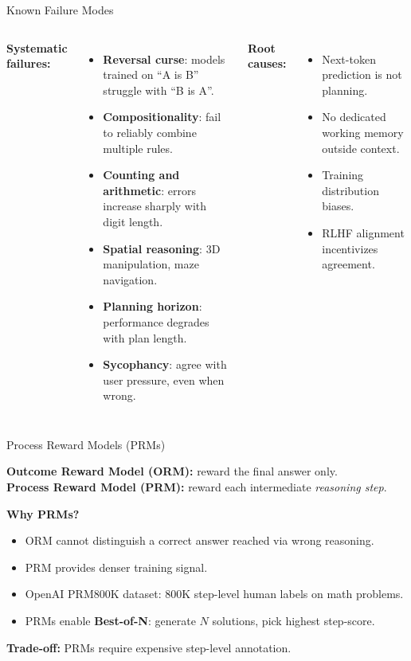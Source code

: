 \documentclass[aspectratio=169,10pt]{beamer}
\begin{document}
\begin{frame}{Known Failure Modes}
  \begin{columns}[T]
      \textbf{Systematic failures:}
      \begin{itemize}
        \item \textbf{Reversal curse}: models trained on ``A is B'' struggle with ``B is A''.
        \item \textbf{Compositionality}: fail to reliably combine multiple rules.
        \item \textbf{Counting and arithmetic}: errors increase sharply with digit length.
        \item \textbf{Spatial reasoning}: 3D manipulation, maze navigation.
        \item \textbf{Planning horizon}: performance degrades with plan length.
        \item \textbf{Sycophancy}: agree with user pressure, even when wrong.
      \end{itemize}
      \textbf{Root causes:}
      \begin{itemize}
        \item Next-token prediction is not planning.
        \item No dedicated working memory outside context.
        \item Training distribution biases.
        \item RLHF alignment incentivizes agreement.
      \end{itemize}
  \end{columns}
\end{frame}

\begin{frame}{Process Reward Models (PRMs)}
  \begin{tcolorbox}[hitbox, title=Outcome vs.\ Process Reward]
    \textbf{Outcome Reward Model (ORM):} reward the final answer only.\\
    \textbf{Process Reward Model (PRM):} reward each intermediate \emph{reasoning step}.
  \end{tcolorbox}
  \vspace{0.4em}
  \textbf{Why PRMs?}
  \begin{itemize}
    \item ORM cannot distinguish a correct answer reached via wrong reasoning.
    \item PRM provides denser training signal.
    \item OpenAI PRM800K dataset: 800K step-level human labels on math problems.
    \item PRMs enable \textbf{Best-of-N}: generate $N$ solutions, pick highest step-score.
  \end{itemize}
  \vspace{0.3em}
  \textbf{Trade-off:} PRMs require expensive step-level annotation.
\end{frame}
\end{document}
